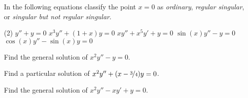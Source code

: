 \setcounter{exercise}{100}

\begin{exercise}
In the following equations
classify the point $x=0$ as \emph{ordinary}, \emph{regular singular}, or
\emph{singular but not regular singular}.
\begin{tasks}(2)
\task $y''+y=0$
\task $x^3y''+(1+x)y=0$
\task $xy''+x^5y'+y=0$
\task $\sin(x)y''-y=0$
\task $\cos(x)y''-\sin(x)y=0$
\end{tasks}
\end{exercise}

\begin{exercise}
Find the general solution of $x^2 y'' -y = 0$.
\end{exercise}

\begin{exercise}
Find a particular solution of $x^2 y'' +(x-\nicefrac{3}{4})y = 0$.
\end{exercise}

\begin{exercise}[tricky]
Find the general solution of $x^2 y'' - x y' +y = 0$.
\end{exercise}

